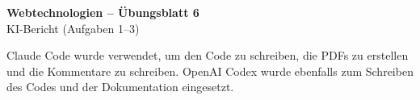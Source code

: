 \documentclass[11pt,a4paper]{article}
\begin{document}
\begin{center}
  {\Large\textbf{Webtechnologien -- Übungsblatt 6}}\\[4pt]
  {\large KI-Bericht (Aufgaben 1--3)}
\end{center}
\medskip
Claude Code wurde verwendet, um den Code zu schreiben, die PDFs zu
erstellen und die Kommentare zu schreiben. OpenAI Codex wurde ebenfalls
zum Schreiben des Codes und der Dokumentation eingesetzt.
\end{document}
